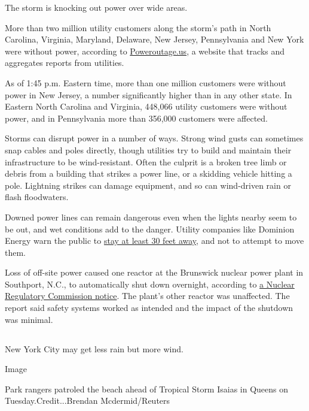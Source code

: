 The storm is knocking out power over wide areas.

More than two million utility customers along the storm's path in North
Carolina, Virginia, Maryland, Delaware, New Jersey, Pennsylvania and New
York were without power, according to
\href{https://slack-redir.net/link?url=http\%3A\%2F\%2FPoweroutage.us}{Poweroutage.us},
a website that tracks and aggregates reports from utilities.

As of 1:45 p.m. Eastern time, more than one million customers were
without power in New Jersey, a number significantly higher than in any
other state. In Eastern North Carolina and Virginia, 448,066 utility
customers were without power, and in Pennsylvania more than 356,000
customers were affected.

Storms can disrupt power in a number of ways. Strong wind gusts can
sometimes snap cables and poles directly, though utilities try to build
and maintain their infrastructure to be wind-resistant. Often the
culprit is a broken tree limb or debris from a building that strikes a
power line, or a skidding vehicle hitting a pole. Lightning strikes can
damage equipment, and so can wind-driven rain or flash floodwaters.

Downed power lines can remain dangerous even when the lights nearby seem
to be out, and wet conditions add to the danger. Utility companies like
Dominion Energy warn the public to
\href{https://twitter.com/DominionEnergy/status/1290609115954323457}{stay
at least 30 feet away}, and not to attempt to move them.

Loss of off-site power caused one reactor at the Brunswick nuclear power
plant in Southport, N.C., to automatically shut down overnight,
according to
\href{https://www.nrc.gov/reading-rm/doc-collections/event-status/event/2020/20200804en.html}{a
Nuclear Regulatory Commission notice}. The plant's other reactor was
unaffected. The report said safety systems worked as intended and the
impact of the shutdown was minimal.

\hypertarget{-3}{%
\subsection{}\label{-3}}

New York City may get less rain but more wind.

Image

Park rangers patroled the beach ahead of Tropical Storm Isaias in Queens
on Tuesday.Credit...Brendan Mcdermid/Reuters

